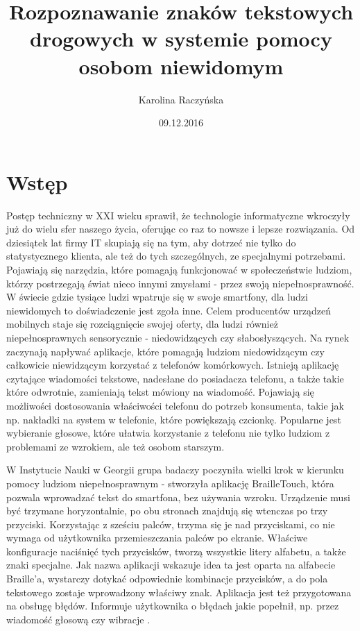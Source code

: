 \documentclass[eng,oneside]{mgr}
\title{Rozpoznawanie znaków tekstowych drogowych w systemie pomocy osobom niewidomym}
\author{Karolina Raczyńska}
\date{09.12.2016}
\begin{document}
\maketitle
\tableofcontents 

\chapter{Wstęp}
Postęp techniczny w XXI wieku sprawił, że technologie informatyczne wkroczyły już do wielu sfer naszego życia, oferując co raz to nowsze i lepsze rozwiązania. Od dziesiątek lat firmy IT skupiają się na tym, aby dotrzeć nie tylko do statystycznego klienta, ale też do tych szczególnych, ze specjalnymi potrzebami. Pojawiają się narzędzia, które pomagają funkcjonować w społeczeństwie ludziom, którzy postrzegają świat nieco innymi zmysłami - przez swoją niepełnosprawność. W świecie gdzie tysiące ludzi wpatruje się w swoje smartfony, dla ludzi niewidomych to doświadczenie jest zgoła inne. Celem producentów urządzeń mobilnych staje się rozciągnięcie swojej oferty, dla ludzi również niepełnosprawnych sensorycznie - niedowidzących czy słabosłyszących. Na rynek zaczynają napływać aplikacje, które pomagają ludziom niedowidzącym czy całkowicie niewidzącym korzystać z telefonów komórkowych. Istnieją aplikację czytające wiadomości tekstowe, nadesłane do posiadacza telefonu, a także takie które odwrotnie, zamieniają tekst mówiony na wiadomość. Pojawiają się możliwości dostosowania właściwości telefonu do potrzeb konsumenta, takie jak np. nakładki na system w telefonie, które powiększają czcionkę. Popularne jest wybieranie głosowe, które ułatwia korzystanie z telefonu nie tylko ludziom z problemami ze wzrokiem, ale też osobom starszym. 
\par W Instytucie Nauki w Georgii grupa badaczy poczyniła wielki krok w kierunku pomocy ludziom niepełnosprawnym - stworzyła aplikację BrailleTouch, która  pozwala wprowadzać tekst do smartfona, bez używania wzroku. Urządzenie musi być trzymane horyzontalnie, po obu stronach znajdują się wtenczas po trzy przyciski. Korzystając z sześciu palców, trzyma się je nad przyciskami, co nie wymaga od użytkownika przemieszczania palców po ekranie. Właściwe konfiguracje naciśnięć tych przycisków, tworzą wszystkie litery alfabetu, a także znaki specjalne. Jak nazwa aplikacji wskazuje idea ta jest oparta na alfabecie Braille'a, wystarczy dotykać odpowiednie kombinacje przycisków, a do pola tekstowego zostaje wprowadzony właściwy znak. Aplikacja jest też przygotowana na obsługę błędów. Informuje użytkownika o błędach jakie popełnił, np. przez wiadomość głosową czy wibracje \cite{touch}. 
\end{document}
